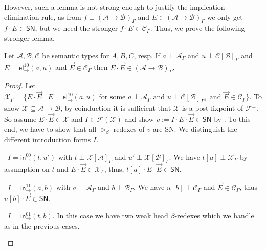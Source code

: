 \documentclass[a4paper,USenglish,cleveref, autoref, thm-restate]{lipics-v2021}
\newenvironment{caselist}{%
  \begin{list}{{\it Case}}{%
  }%
}{\end{list}%
}
\newcommand{\nextcase}{\item~}
\newcommand{\tin}{\ensuremath{\mathsf{in}}}
\newcommand{\inn}[2]{\ensuremath{\tin_{#1}^{#2}}}
\newcommand{\tel}{\mathsf{el}}
\newcommand{\el}[2]{\ensuremath{\tel_{#1}^{#2}}}
\newcommand{\contract}[1][]{\mapsto_{#1}}
\newcommand{\whd}[1][]{\rhd_{#1}}
\newcommand{\A}{\mathcal{A}}
\newcommand{\B}{\mathcal{B}}
\newcommand{\C}{\mathcal{C}}
\newcommand{\F}{\mathcal{F}}
\newcommand{\X}{\mathcal{X}}
\newcommand{\SN}{\mathsf{SN}}
\begin{document}
%
%
However, such a lemma
is not strong enough to justify the implication
elimination rule, as from $f \perp (\A \to \B)_\Gamma$ and $E \in (\A
\to \B)_\Gamma$ we only get $f \cdot E \in \SN$, but we need the
stronger $f \cdot E \in \C_\Gamma$.
Thus, we prove the following stronger lemma.

\begin{lemma}
  \label{lem:appprev}
  Let $\A,\B,\C$ be semantic types for $A,B,C$, resp.  If
  $a \perp \A_\Gamma$ and $u \perp \C[\B]_\Gamma$ and
  $E = \el\to{10}(a,u)$ and $\vec E \in \C_\Gamma$ then
  $E \cdot \vec E \in (\A \to \B)_\Gamma$.
\end{lemma}

\begin{proof}
  Let $\X_\Gamma = \{ E \cdot \vec E \mid E = \el\to{10}(a,u)
  \mbox{ for some } a \perp \A_\Gamma \mbox{ and } u \perp \C[\B]_\Gamma,
  \mbox{ and } \vec E \in \C_\Gamma \}$.
  To show $\X \subseteq \A \to \B$, by coinduction
  it is sufficient that $\X$ is a post-fixpoint of $\F^\perp$.  So
  assume $E \cdot \vec E \in \X$ and $I \in \F(\X)$ and show
  $v := I \cdot E \cdot \vec E \in \SN$
  by .  To this end, we have to show that all
  $\whd[\beta]$-redexes of $v$ are SN.
  We distinguish the different introduction forms $I$.
  \begin{caselist}

    \nextcase $I = \inn\to{00}(t,u')$ with
    $t \perp \X[\A]_\Gamma$ and
    $u' \perp \X[\B]_\Gamma$.
    We have
    $t[a] \perp \X_\Gamma$ by assumption on $t$ and
    $E \cdot \vec E \in \X_\Gamma$,
    thus, $t[a] \cdot E \cdot \vec E \in \SN$.

    \nextcase $I = \inn\to{11}(a,b)$ with $a \perp \A_\Gamma$ and
    $b \perp \B_\Gamma$.
    We have
    $u[b] \perp \C_\Gamma$ and $\vec E \in \C_\Gamma$,
    thus $u[b] \cdot \vec E \in \SN$.

    \nextcase $I = \inn\to{01}(t,b)$.  In this case we have two
      weak head $\beta$-redexes which we handle as in the
      previous cases.
  \popQED
  \end{caselist}
\end{proof}
\end{document}
